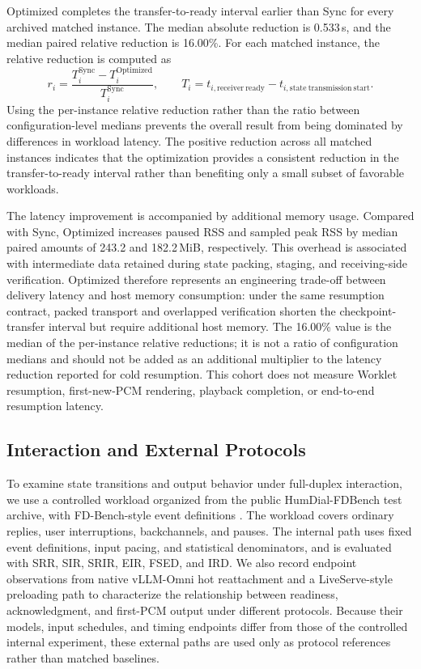 \documentclass{article}
\begin{document}
Optimized completes the transfer-to-ready interval earlier than Sync for
every archived matched instance. The median absolute reduction is
0.533\,s, and the median paired relative reduction is 16.00\%. For each
matched instance, the relative reduction is computed as
\[
r_i =
    \frac{T_i^{\mathrm{Sync}}-T_i^{\mathrm{Optimized}}}
      {T_i^{\mathrm{Sync}}},
    \qquad
    T_i = t_{i,\mathrm{receiver\ ready}}-t_{i,\mathrm{state\ transmission\ start}}.
\]
Using the per-instance relative reduction rather than the ratio between
configuration-level medians prevents the overall result from being
dominated by differences in workload latency. The positive reduction
across all matched instances indicates that the optimization provides a
 consistent reduction in the transfer-to-ready interval rather than benefiting
only a small subset of favorable workloads.

The latency improvement is accompanied by additional memory usage.
Compared with Sync, Optimized increases paused RSS and sampled peak RSS
by median paired amounts of 243.2 and 182.2\,MiB, respectively. This
overhead is associated with intermediate data retained during state
packing, staging, and receiving-side verification. Optimized therefore
represents an engineering trade-off between delivery latency and host
memory consumption: under the same resumption contract, packed transport
and overlapped verification shorten the checkpoint-transfer interval but
require additional host memory. The 16.00\% value is the median of the
per-instance relative reductions; it is not a ratio of configuration
medians and should not be added as an additional multiplier to the
latency reduction reported for cold resumption. This cohort does not measure
Worklet resumption, first-new-PCM rendering, playback completion, or
end-to-end resumption latency.

\subsection{Interaction and External Protocols}
\label{sec:interaction}

To examine state transitions and output behavior under full-duplex
interaction, we use a controlled workload organized from the public
HumDial-FDBench test archive, with FD-Bench-style event definitions
\citep{humdialdataset2026,fdbench2025}. The workload covers ordinary replies, user
interruptions, backchannels, and pauses. The internal path uses fixed
event definitions, input pacing, and statistical denominators, and is
evaluated with SRR, SIR, SRIR, EIR, FSED, and IRD. We also record
endpoint observations from native vLLM-Omni hot reattachment and a
LiveServe-style preloading path to characterize the relationship between
readiness, acknowledgment, and first-PCM output under different
protocols. Because their models, input schedules, and timing endpoints
differ from those of the controlled internal experiment, these external
paths are used only as protocol references rather than matched baselines.
\end{document}
